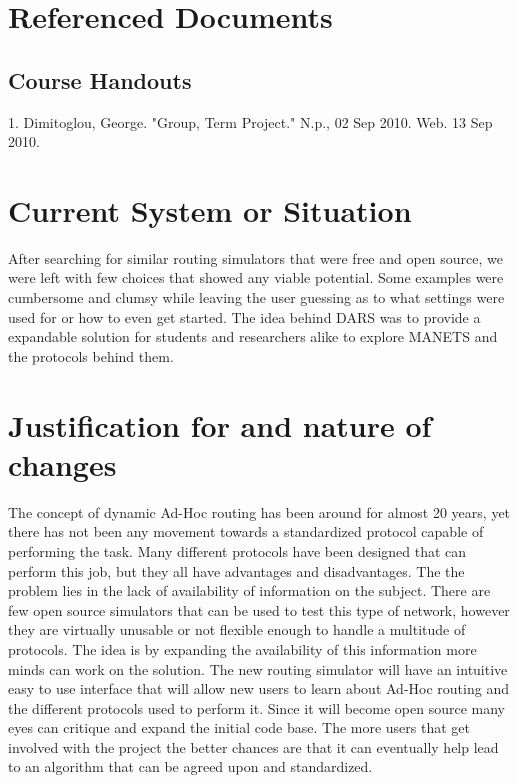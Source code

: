 \documentclass[a4paper,11pt,titlepage]{article}
\begin{document}
\section{Referenced Documents}
\subsection{Course Handouts}
1. Dimitoglou, George. "Group, Term Project." N.p., 02 Sep 2010. Web. 13 Sep 2010.  
\section{Current System or Situation}
After searching for similar routing simulators that were free and open source, we were left with few choices that showed any viable potential.  Some examples were cumbersome and clumsy while leaving the user guessing as to what settings were used for or how to even get started. The idea behind DARS was to provide a expandable solution for students and researchers alike to explore MANETS and the protocols behind them.
 
\section{Justification for and nature of changes}
The concept of dynamic Ad-Hoc routing has been around for almost 20 years, yet there has not been any movement towards a standardized protocol capable of performing the task.  Many different protocols have been designed that can perform this job, but they all have advantages and disadvantages.  The the problem lies in the lack of availability of information on the subject. There are few open source simulators that can be used to test this type of network, however they are virtually unusable or not flexible enough to handle a multitude of protocols. The idea is by expanding the availability of this information more minds can work on the solution.  The new routing simulator will have an intuitive easy to use interface that will allow new users to learn about Ad-Hoc routing and the different protocols used to perform it.  Since it will become open source many eyes can critique and expand the initial code base.  The more users that get involved with the project the better chances are that it can eventually help lead to an algorithm that can be agreed upon and standardized. 
 
\end{document}
